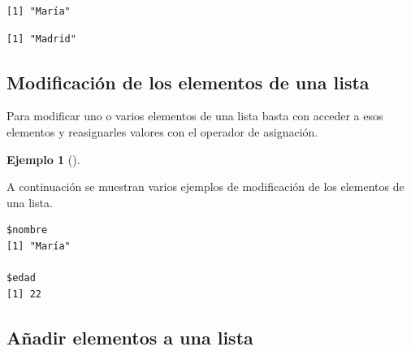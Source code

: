 \documentclass[
  a4paper,
]{scrreport}
\newenvironment{Shaded}{\begin{snugshade}}{\end{snugshade}}
\newcommand{\CommentTok}[1]{\textcolor[rgb]{0.37,0.37,0.37}{#1}}
\newcommand{\DecValTok}[1]{\textcolor[rgb]{0.68,0.00,0.00}{#1}}
\newcommand{\FunctionTok}[1]{\textcolor[rgb]{0.28,0.35,0.67}{#1}}
\newcommand{\NormalTok}[1]{\textcolor[rgb]{0.00,0.23,0.31}{#1}}
\newcommand{\OtherTok}[1]{\textcolor[rgb]{0.00,0.23,0.31}{#1}}
\newcommand{\SpecialCharTok}[1]{\textcolor[rgb]{0.37,0.37,0.37}{#1}}
\newcommand{\StringTok}[1]{\textcolor[rgb]{0.13,0.47,0.30}{#1}}
\theoremstyle{definition}
\theoremstyle{definition}
\newtheorem{example}{Ejemplo}[chapter]
\theoremstyle{remark}
\begin{document}
\begin{verbatim}
[1] "María"
\end{verbatim}

\begin{Shaded}
\end{Shaded}

\begin{verbatim}
[1] "Madrid"
\end{verbatim}

\hypertarget{modificaciuxf3n-de-los-elementos-de-una-lista}{%
\subsection{Modificación de los elementos de una
lista}\label{modificaciuxf3n-de-los-elementos-de-una-lista}}

Para modificar uno o varios elementos de una lista basta con acceder a
esos elementos y reasignarles valores con el operador de asignación.

\leavevmode{}%
\begin{example}[]\label{exm-modificacion-listas}

A continuación se muestran varios ejemplos de modificación de los
elementos de una lista.

\begin{Shaded}
\end{Shaded}

\begin{verbatim}
$nombre
[1] "María"

$edad
[1] 22
\end{verbatim}

\end{example}

\hypertarget{auxf1adir-elementos-a-una-lista}{%
\subsection{Añadir elementos a una
lista}\label{auxf1adir-elementos-a-una-lista}}
\end{document}
